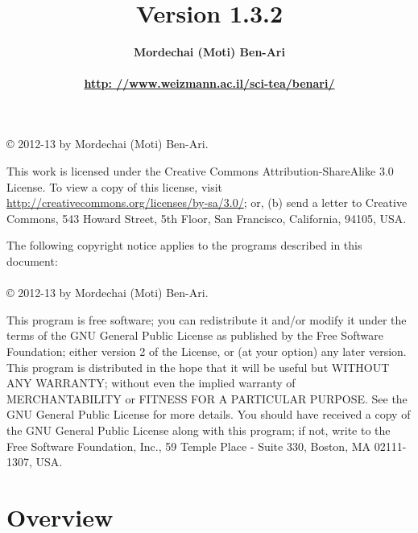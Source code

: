 \documentclass[11pt]{report}
\title{\bfseries \ls\\\mbox{}\\\mbox{}\\
\bfseries\normalsize Version 1.3.2}
\author{\bfseries Mordechai (Moti) Ben-Ari\\\mbox{}\\
\url{http: //www.weizmann.ac.il/sci-tea/benari/}}
\begin{document}
\maketitle

\thispagestyle{empty}

\vspace*{\fill}

\begin{center}
\copyright{} 2012-13 by Mordechai (Moti) Ben-Ari.
\end{center}
This work is licensed under the Creative Commons Attribution-ShareAlike 3.0
License. To view a copy of this license, visit
\url{http://creativecommons.org/licenses/by-sa/3.0/}; or, (b) send a letter
to Creative Commons, 543 Howard Street, 5th Floor, San Francisco,
California, 94105, USA.

\bigskip\bigskip

 
\begin{center}
The following copyright notice applies to the programs described in this
document:\mbox{}\\\mbox{}\\
\copyright{} 2012-13 by Mordechai (Moti) Ben-Ari.
\end{center}

This program is free software; you can redistribute it and/or
modify it under the terms of the GNU General Public License
as published by the Free Software Foundation; either version 2
of the License, or (at your option) any later version.
This program is distributed in the hope that it will be useful
but WITHOUT ANY WARRANTY; without even the implied warranty of
MERCHANTABILITY or FITNESS FOR A PARTICULAR PURPOSE.
See the GNU General Public License for more details.
You should have received a copy of the GNU General Public License
along with this program; if not, write to the Free Software
Foundation, Inc., 59 Temple Place - Suite 330, Boston, MA
02111-1307, USA.

\vspace*{\fill}

\setcounter{tocdepth}{1}
\tableofcontents

\thispagestyle{empty}

\setcounter{page}{0}

\newpage


\section*{Overview}
\end{document}
